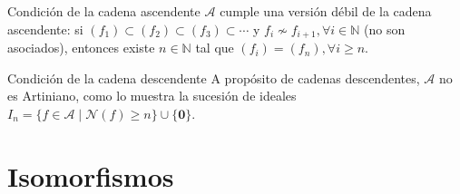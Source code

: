 \documentclass{beamer}
\begin{document}
\begin{frame}{Condición de la cadena ascendente}
    $\mathcal{A}$ cumple una versión débil de la cadena ascendente: si $(f_1) \subset (f_2) \subset (f_3) \subset \cdots$ y $f_i \nsim f_{i+1}, \forall i \in \mathbb{N}$ (no son asociados), entonces existe $n \in \mathbb{N}$ tal que $(f_i) = (f_n), \forall i \ge n$.
\end{frame}

\begin{frame}{Condición de la cadena descendente}
    A propósito de cadenas descendentes, $\mathcal{A}$ no es Artiniano, como lo muestra la sucesión de ideales $I_n = \{ f \in \mathcal{A} \mid \mathcal{N}(f) \ge n \} \cup \{ \mathbf{0} \}$.
\end{frame}

\section{Isomorfismos}
\end{document}
